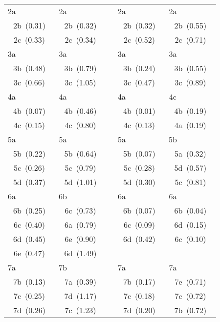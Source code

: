\documentclass[nofootinbib,10pt,aip,twocolumn,showpacs]{revtex4-1}
\begin{document}
\begin{table}
\begin{ruledtabular}
\begin{tabular}{ccccc}
  2a~~~~~~~~~ &  2a~~~~~~~~~ &&  2a~~~~~~~~~  &  2a~~~~~~~~~  \\  
  2b~(0.31)   &  2b~(0.32)   &&  2b~(0.32)    &  2b~(0.55)    \\  
  2c~(0.33)   &  2c~(0.34)   &&  2c~(0.52)    &  2c~(0.71)    \\\hline
  3a~~~~~~~~~ &  3a~~~~~~~~~ &&  3a~~~~~~~~~  &  3a~~~~~~~~~  \\  
  3b~(0.48)   &  3b~(0.79)   &&  3b~(0.24)    &  3b~(0.55)    \\  
  3c~(0.66)   &  3c~(1.05)   &&  3c~(0.47)    &  3c~(0.89)    \\\hline
  4a~~~~~~~~~ &  4a~~~~~~~~~ &&  4a~~~~~~~~~  &  4c~~~~~~~~~  \\  
  4b~(0.07)   &  4b~(0.46)   &&  4b~(0.01)    &  4b~(0.19)    \\  
  4c~(0.15)   &  4c~(0.80)   &&  4c~(0.13)    &  4a~(0.19)    \\\hline
  5a~~~~~~~~~ &  5a~~~~~~~~~ &&  5a~~~~~~~~~  &  5b~~~~~~~~~  \\  
  5b~(0.22)   &  5b~(0.64)   &&  5b~(0.07)    &  5a~(0.32)    \\  
  5c~(0.26)   &  5c~(0.79)   &&  5c~(0.28)    &  5d~(0.57)    \\  
  5d~(0.37)   &  5d~(1.01)   &&  5d~(0.30)    &  5c~(0.81)    \\\hline
  6a~~~~~~~~~ &  6b~~~~~~~~~ &&  6a~~~~~~~~~  &  6a~~~~~~~~~  \\  
  6b~(0.25)   &  6c~(0.73)   &&  6b~(0.07)    &  6b~(0.04)    \\  
  6c~(0.40)   &  6a~(0.79)   &&  6c~(0.09)    &  6d~(0.15)    \\  
  6d~(0.45)   &  6e~(0.90)   &&  6d~(0.42)    &  6c~(0.10)    \\ 
  6e~(0.47)   &  6d~(1.49)   &&               &               \\\hline
  7a~~~~~~~~~ &  7b~~~~~~~~~ &&  7a~~~~~~~~~  &  7a~~~~~~~~~  \\  
  7b~(0.13)   &  7a~(0.39)   &&  7b~(0.17)    &  7e~(0.71)    \\  
  7c~(0.25)   &  7d~(1.17)   &&  7c~(0.18)    &  7c~(0.72)    \\  
  7d~(0.26)   &  7c~(1.23)   &&  7d~(0.20)    &  7b~(0.72)    \\  

\end{tabular}
\end{ruledtabular}
\end{table}
\end{document}
